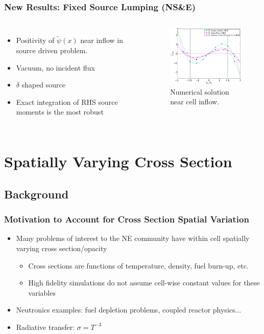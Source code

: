 \documentclass{beamer}
\begin{document}
\begin{frame}
\frametitle{New Results: Fixed Source Lumping (NS\&E)}
\begin{columns}[c]
\begin{itemize}
\item Positivity of $\widetilde{\psi}(x)$ near inflow in source driven problem.
\item Vacuum, no incident flux
\item $\delta$ shaped source
\item Exact integration of RHS source moments is the most robust
\end{itemize}
 
\begin{figure}
\includegraphics[width=5cm]{Final_Inflow_RHS_Comparison_Source_P3_MFP_0.eps}
\caption{Numerical solution near cell inflow.}
\end{figure}
\end{columns}
\end{frame}

\section[Cross Section]{Spatially Varying Cross Section}
\subsection{Background}

\begin{frame}
\frametitle{Motivation to Account for Cross Section Spatial Variation}
\begin{itemize}
\item Many problems of interest to the NE community have within cell spatially varying cross section/opacity
\begin{itemize}
\item Cross sections are functions of temperature, density, fuel burn-up, etc.
\item High fidelity simulations do not assume cell-wise constant values for these variables
\end{itemize}
\item Neutronics examples: fuel depletion problems, coupled reactor physics...
\item Radiative transfer: $\sigma = T^{-3}$
\end{itemize}
\end{frame}
\end{document}
